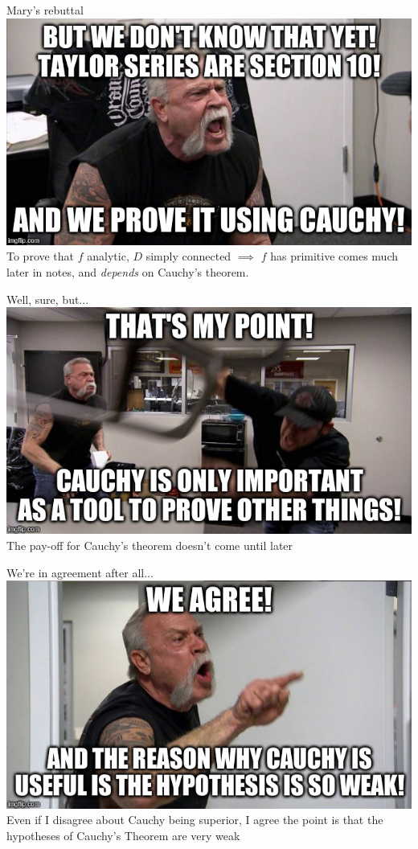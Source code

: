 \documentclass{beamer}
\begin{document}
\begin{frame}{Mary's rebuttal}\includegraphics[width=\textwidth,height=0.8\textheight,keepaspectratio]{ChopperFilled3.jpg}
To prove that $f$ analytic, $D$ simply connected $\implies$ $f$ has primitive comes much later in notes, and \emph{depends} on Cauchy's theorem.
\end{frame}
\begin{frame}{Well, sure, but...}\includegraphics[width=\textwidth,height=0.8\textheight,keepaspectratio]{ChopperFilled4.jpg}
The pay-off for Cauchy's theorem doesn't come until later
\end{frame}
\begin{frame}{We're in agreement after all...}\includegraphics[width=\textwidth,height=0.8\textheight,keepaspectratio]{ChopperFilled5.jpg}
Even if I disagree about Cauchy being superior, I agree the point is that the hypotheses of Cauchy's Theorem are very weak
\end{frame}
\end{document}
